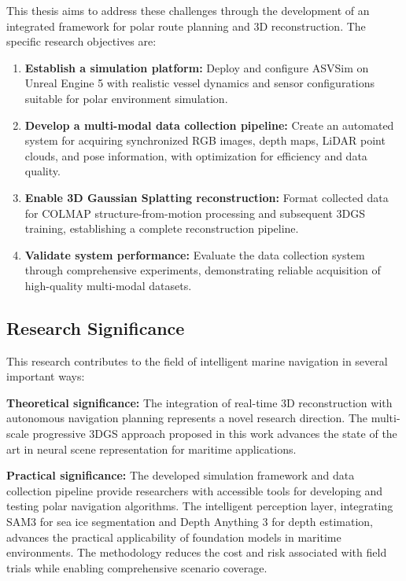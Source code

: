 This thesis aims to address these challenges through the development of an integrated framework for polar route planning and 3D reconstruction. The specific research objectives are:

\begin{enumerate}
    \item \textbf{Establish a simulation platform:} Deploy and configure ASVSim on Unreal Engine 5 with realistic vessel dynamics and sensor configurations suitable for polar environment simulation.

    \item \textbf{Develop a multi-modal data collection pipeline:} Create an automated system for acquiring synchronized RGB images, depth maps, LiDAR point clouds, and pose information, with optimization for efficiency and data quality.

    \item \textbf{Enable 3D Gaussian Splatting reconstruction:} Format collected data for COLMAP structure-from-motion processing and subsequent 3DGS training, establishing a complete reconstruction pipeline.

    \item \textbf{Validate system performance:} Evaluate the data collection system through comprehensive experiments, demonstrating reliable acquisition of high-quality multi-modal datasets.
\end{enumerate}

\subsection{Research Significance}

This research contributes to the field of intelligent marine navigation in several important ways:

\textbf{Theoretical significance:} The integration of real-time 3D reconstruction with autonomous navigation planning represents a novel research direction. The multi-scale progressive 3DGS approach proposed in this work advances the state of the art in neural scene representation for maritime applications.

\textbf{Practical significance:} The developed simulation framework and data collection pipeline provide researchers with accessible tools for developing and testing polar navigation algorithms. The intelligent perception layer, integrating SAM3 for sea ice segmentation and Depth Anything 3 for depth estimation, advances the practical applicability of foundation models in maritime environments. The methodology reduces the cost and risk associated with field trials while enabling comprehensive scenario coverage.

